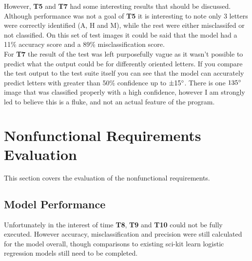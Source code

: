 \documentclass[12pt, titlepage]{article}
\begin{document}
However, \textbf{T5} and \textbf{T7} had some interesting results that should be discussed.\\

Although performance was not a goal of \textbf{T5} it is interesting to note only 3 letters were correctly identified (A, H and M), while the
rest were either misclassifed or not classified. On this set of test images it could be said that the model had a 11\% accuracy score and a 89\% misclassification score. \\

For \textbf{T7} the result of the test was left purposefully vague as it wasn't possible to predict what the output could be for differently oriented letters.
If you compare the test output to the test suite itself you can see that the model can accurately predict letters with greater than 50\% confidence 
up to $\pm 15\degree$. There is one $135\degree$ image that was classified properly with a high confidence, however I am strongly led to believe
this is a fluke, and not an actual feature of the program.

\section{Nonfunctional Requirements Evaluation}

This section covers the evaluation of the nonfunctional requirements.
		
\subsection{Model Performance}

Unfortunately in the interest of time \textbf{T8}, \textbf{T9} and \textbf{T10} could not be fully executed. However
accuracy, misclassification and precision were still calculated for the model overall, though
comparisons to existing sci-kit learn logistic regression models still need to be completed.
\end{document}
